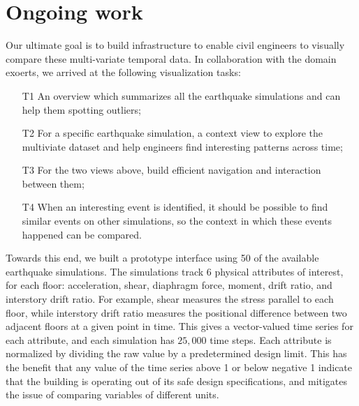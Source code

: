 \section{Ongoing work} %
\label{sec:vis}

Our ultimate goal is to build infrastructure to enable civil engineers to visually compare these multi-variate temporal data. In collaboration with the domain exoerts, we arrived at the following visualization tasks:
\begin{itemize}
	\item [T1] An overview which summarizes all the earthquake simulations and can help them spotting outliers;
	\item [T2] For a specific earthquake simulation, a context view to explore the multiviate dataset and help engineers find interesting patterns across time;
	\item [T3] For the two views above, build efficient navigation and interaction between them;
        \item [T4] When an interesting event is identified, it should be possible to find similar events on other simulations, so the context in which these events happened can be compared.
\end{itemize} 



Towards this end, we built a prototype interface using 50 of the available earthquake simulations.
The simulations track 6 physical attributes of interest, for each floor: acceleration, shear, diaphragm force, moment, drift ratio, and interstory drift ratio. For example, shear measures the stress parallel to each floor, while interstory drift ratio measures the positional difference between two adjacent floors at a given point in time. 
This gives a vector-valued time series for each attribute, and each simulation has $25,000$ time steps.
Each attribute is normalized by dividing the raw value by a predetermined design limit. This has the benefit that any value of the time series above 1 or below negative 1 indicate that the building is operating out of its safe design specifications, and mitigates the issue of comparing variables of different units.

